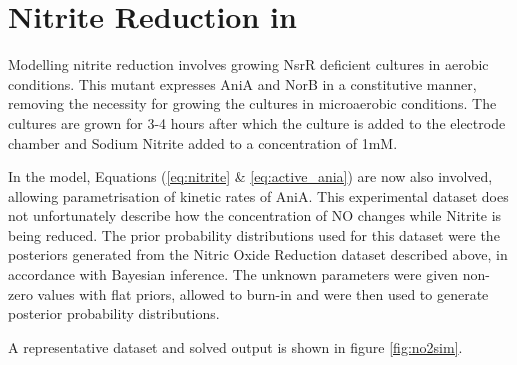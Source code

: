 \chapter{Nitrite Reduction in \Nm{}}

Modelling nitrite reduction involves growing NsrR deficient cultures in aerobic conditions. This mutant expresses AniA and NorB in a constitutive manner, removing the necessity for growing the cultures in microaerobic conditions. The cultures are grown for 3-4 hours after which the culture is added to the electrode chamber and Sodium Nitrite added to a concentration of 1mM.

In the model, Equations (\ref{eq:nitrite} \& \ref{eq:active_ania}) are now also involved, allowing parametrisation of kinetic rates of AniA. This experimental dataset does not unfortunately describe how the concentration of NO changes while Nitrite is being reduced. The prior probability distributions used for this dataset were the posteriors generated from the Nitric Oxide Reduction dataset described above, in accordance with Bayesian inference. The unknown parameters were given non-zero values with flat priors, allowed to burn-in and were then used to generate posterior probability distributions.

A representative dataset and solved output is shown in figure \ref{fig:no2sim}. 


